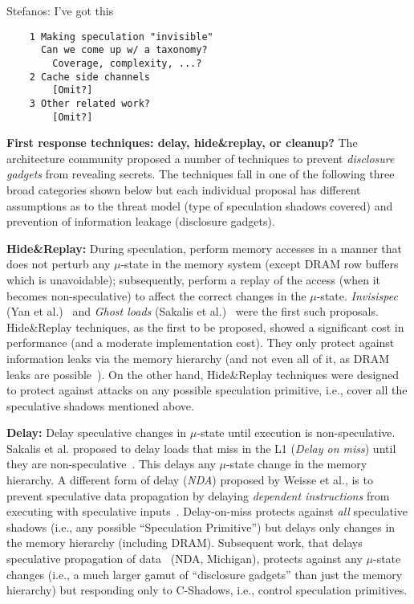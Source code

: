 {\color{red} Stefanos: I've got this}
\begin{verbatim}
    1 Making speculation "invisible"
      Can we come up w/ a taxonomy?
        Coverage, complexity, ...?
    2 Cache side channels 
        [Omit?]
    3 Other related work?
        [Omit?]
\end{verbatim}

\noindent \textbf{First response techniques: delay, hide\&replay, or cleanup?}
The architecture community proposed a number of techniques to prevent \emph{disclosure gadgets} from revealing secrets. The techniques fall in one of the following three broad categories shown below but each individual proposal has different assumptions as to the threat model (type of speculation shadows covered) and prevention of information leakage (disclosure gadgets).
\squishlist
\item{\textbf{Hide\&Replay:}} During speculation, perform memory accesses in a manner that does not perturb any $\mu$-state in the memory system (except DRAM row buffers which is unavoidable); subsequently, perform a replay of the access (when it becomes non-speculative) to affect the correct changes in the $\mu$-state. \emph{Invisispec} (Yan et al.)~\cite{yan_invisispec:MICRO2018} and \emph{Ghost loads} (Sakalis et al.)~\cite{sakalis2019ghost} were the first such proposals. 
Hide\&Replay techniques, as the first to be proposed, showed a significant cost in performance (and a moderate implementation cost). They only protect against information leaks via the memory hierarchy (and not even all of it, as DRAM leaks are possible~\cite{pessl2016drama}). On the other hand, Hide\&Replay techniques were designed to protect against attacks on any possible speculation primitive, i.e., cover all the speculative shadows mentioned above. 
\item{\textbf{Delay:}} Delay speculative changes in $\mu$-state until execution is non-speculative. Sakalis et al. proposed to delay loads that miss in the L1 (\emph{Delay on miss}) until they are non-speculative~\cite{sakalis2019efficient}. This delays any $\mu$-state change in the memory hierarchy. A different form of delay (\emph{NDA}) proposed by Weisse et al., is to prevent speculative data propagation by delaying \emph{dependent instructions} from executing with speculative inputs~\cite{weisse2019nda}. Delay-on-miss protects against \emph{all} speculative shadows (i.e., any possible ``Speculation Primitive'') but delays only changes in the memory hierarchy (including DRAM). Subsequent work, that delays speculative propagation of data~\cite{weisse2019nda} (NDA, Michigan), protects against any $\mu$-state changes (i.e., a much larger gamut of ``disclosure gadgets'' than just the memory hierarchy) but responding only to C-Shadows, i.e., control speculation primitives.
